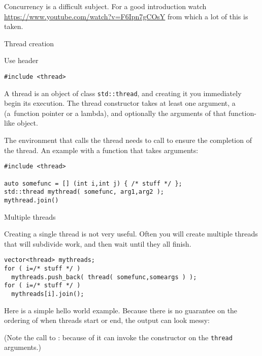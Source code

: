 
Concurrency is a difficult subject.
For a good introduction watch
\url{https://www.youtube.com/watch?v=F6Ipn7gCOsY}
from which a lot of this is taken.

 {Thread creation}

Use header
\begin{lstlisting}
#include <thread>
\end{lstlisting}

A thread is an object of class \lstinline+std::thread+,
and creating it you immediately begin its execution.
The thread constructor takes at least one argument,
a 
(a~function pointer or a lambda),
and optionally the arguments of that function-like object.

The environment that calls the thread needs to call 
to ensure the completion of the thread.
%
%
An example with a function that takes arguments:

\begin{lstlisting}
#include <thread>
  
auto somefunc = [] (int i,int j) { /* stuff */ };
std::thread mythread( somefunc, arg1,arg2 );
mythread.join()
\end{lstlisting}

 {Multiple threads}

Creating a single thread is not very useful.
Often you will create multiple threads
that will subdivide work,
and then wait until they all finish.
\begin{lstlisting}
vector<thread> mythreads;
for ( i=/* stuff */ )
  mythreads.push_back( thread( somefunc,someargs ) );
for ( i=/* stuff */ )
  mythreads[i].join();
\end{lstlisting}

Here is a simple hello world example.
Because there is no guarantee on the ordering of when threads
start or end, the output can look messy:
%

(Note the call to :
because of 
it can invoke the constructor on the \lstinline{thread} arguments.)

